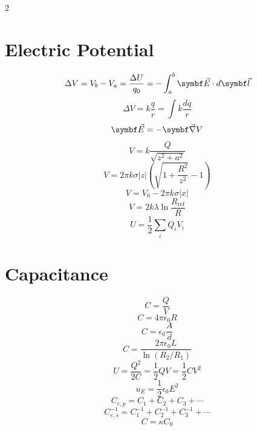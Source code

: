 \begin{multicols*}{2}
\section{Electric Potential}

\begin{equation*}
    \Delta V = V_b - V_a = \frac{\Delta U}{q_0} = -\int_a^b \bvec{E} \cdot d\bvec{l}
\end{equation*}
\begin{equation*}
    \Delta V = k\frac{q}{r} = \int k\frac{dq}{r}
\end{equation*}
\begin{equation*}
    \bvec{E} = -\bvec{\nabla}V
\end{equation*}
\begin{equation*}
    V = k\frac{Q}{\sqrt{z^2 + a^2}}
\end{equation*}
\begin{equation*}
    V = 2\pi k \sigma \lvert z \rvert \left( \sqrt{1 + \frac{R^2}{z^2}} - 1 \right)
\end{equation*}
\begin{equation*}
    V = V_0 - 2\pi k \sigma \lvert x \rvert
\end{equation*}
\begin{equation*}
    V = 2k\lambda \ln{\frac{R_\mathrm{ref}}{R}}
\end{equation*}
\begin{equation*}
    U = \frac{1}{2} \sum_i Q_i V_i
\end{equation*}

\section{Capacitance}

\begin{equation*}
    C = \frac{Q}{V}
\end{equation*}
\begin{equation*}
    C = 4 \pi \epsilon_0 R
\end{equation*}
\begin{equation*}
    C = \epsilon_0 \frac{A}{d}
\end{equation*}
\begin{equation*}
    C = \frac{2\pi\epsilon_0 L}{\ln \left( R_2/R_1 \right)}
\end{equation*}
\begin{equation*}
    U = \frac{Q^2}{2C} = \frac{1}{2}QV = \frac{1}{2}CV^2
\end{equation*}
\begin{equation*}
    u_E = \frac{1}{2}\epsilon_0 E^2
\end{equation*}
\begin{equation*}
    C_{e,p} = C_1 + C_2 + C_3 + \cdots
\end{equation*}
\begin{equation*}
    C_{e,s}^{-1} = C_1^{-1} + C_2^{-1} + C_3^{-1} + \cdots
\end{equation*}
\begin{equation*}
    C = \kappa C_0
\end{equation*}

\end{multicols*}
